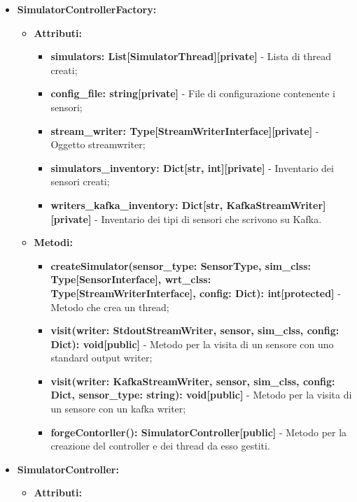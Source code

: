 \documentclass[8pt]{article}
\begin{document}
\begin{itemize}
	\setlength\itemsep{0em}
    \item \textbf{SimulatorControllerFactory:}
    \begin{itemize}
	\setlength\itemsep{0em}
        \item \textbf{Attributi:}
        \begin{itemize}
	\setlength\itemsep{0em}
            \item \textbf{simulators: List[SimulatorThread][private]} - Lista di thread creati;
            \item \textbf{config\_file: string[private]} - File di configurazione contenente i sensori;
            \item \textbf{stream\_writer: Type[StreamWriterInterface][private]} - Oggetto streamwriter;
            \item \textbf{simulators\_inventory: Dict[str, int][private]} - Inventario dei sensori creati;
            \item \textbf{writers\_kafka\_inventory: Dict[str, KafkaStreamWriter][private]} - Inventario dei tipi di sensori che scrivono su Kafka.
        \end{itemize}
        \item \textbf{Metodi:}
        \begin{itemize}
	\setlength\itemsep{0em}
            \item \textbf{createSimulator(sensor\_type: SensorType, sim\_clss: Type[SensorInterface], wrt\_clss: Type[StreamWriterInterface], config: Dict): int[protected]} - Metodo che crea un thread;
            \item \textbf{visit(writer: StdoutStreamWriter, sensor, sim\_clss, config: Dict): void[public]} - Metodo per la visita di un sensore con uno standard output writer;
            \item \textbf{visit(writer: KafkaStreamWriter, sensor, sim\_clss, config: Dict, sensor\_type: string): void[public]} - Metodo per la visita di un sensore con un kafka writer;
            \item \textbf{forgeContorller(): SimulatorController[public]} - Metodo per la creazione del controller e dei thread da esso gestiti.
        \end{itemize}
    \end{itemize}
    \item \textbf{SimulatorController:}
    \begin{itemize}
	\setlength\itemsep{0em}
        \item \textbf{Attributi:}

\end{itemize}
\end{itemize}
\end{document}
